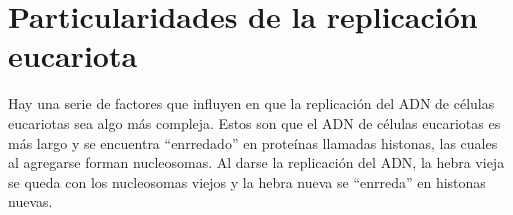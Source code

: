 \section{Particularidades de la replicación eucariota}

Hay una serie de factores que influyen en que la replicación del ADN de células eucariotas sea algo más compleja. Estos son que el ADN de células eucariotas es más largo y se encuentra ``enrredado'' en proteínas llamadas histonas, las cuales al agregarse forman nucleosomas. Al darse la replicación del ADN, la hebra vieja se queda con los nucleosomas viejos y la hebra nueva se ``enrreda'' en histonas nuevas.